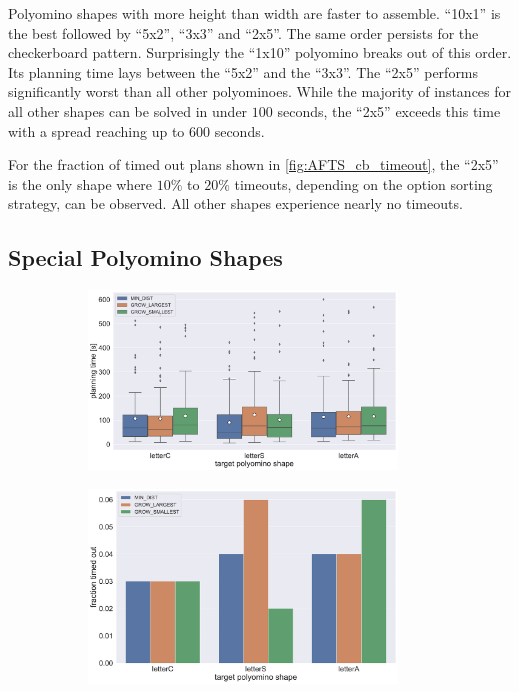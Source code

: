 Polyomino shapes with more height than width are faster to assemble.
``10x1'' is the best followed by ``5x2'', ``3x3'' and ``2x5''.
The same order persists for the checkerboard pattern.
Surprisingly the ``1x10'' polyomino breaks out of this order.
Its planning time lays between the ``5x2'' and the ``3x3''.
The ``2x5'' performs significantly worst than all other polyominoes.
While the majority of instances for all other shapes can be solved in under $100$ seconds, the ``2x5'' exceeds this time with a spread reaching up to $600$ seconds.

For the fraction of timed out plans shown in \autoref{fig:AFTS_cb_timeout}, the ``2x5'' is the only shape where $10\%$ to $20\%$ timeouts, depending on the option sorting strategy, can be observed.
All other shapes experience nearly no timeouts.

\subsection{Special Polyomino Shapes}
\label{sec:special_poly}


\begin{figure}
	\centering
	\begin{subfigure}[b]{\textwidth}
		\centering
		\includegraphics[width=0.9\textwidth]{figures/plots/AFTS_sp_time.pdf}
		\caption{}
		\label{fig:AFTS_sp_time}
	\end{subfigure}
	
	\begin{subfigure}[b]{\textwidth}
		\centering
		\includegraphics[width=0.9\textwidth]{figures/plots/AFTS_sp_timeout.pdf}
		\caption{}
		\label{fig:AFTS_sp_timeout}
	\end{subfigure}
	\caption[]{}
	\label{fig:AFTS_sp_timestats}
\end{figure}

